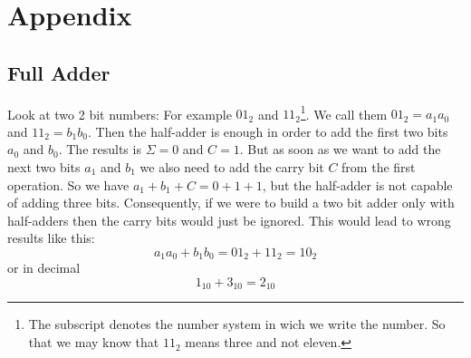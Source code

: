 \documentclass[10pt,a4paper]{article}
\begin{document}
\section{Appendix}
\subsection{Full Adder}\label{subsec:appendix-full-adder}

Look at two 2 bit numbers: For example $01_2$ and $11_2$\footnote{The subscript denotes the number system in wich we write the number. So that we may know that $11_2$ means three and not eleven.}.  We call them $01_2 = a_1a_0$ and $11_2 = b_1b_0$. Then the half-adder is enough in order to add the first two bits $a_0$ and $b_0$. The results is $\Sigma=0$ and $C=1$. But as soon as we want to add the next two bits $a_1$ and $b_1$ we also need to add the carry bit $C$ from the first operation. So we have $a_1+b_1+C = 0 + 1 + 1$, but the half-adder is not capable of adding three bits. Consequently, if we were to build a two bit adder only with half-adders then the carry bits would just be ignored. This would lead to wrong results like this:
\[
a_1a_0 + b_1b_0 = 01_2 + 11_2 = 10_2
\]
or in decimal
\[
1_{10} + 3_{10} = 2_{10}
\]
\end{document}
